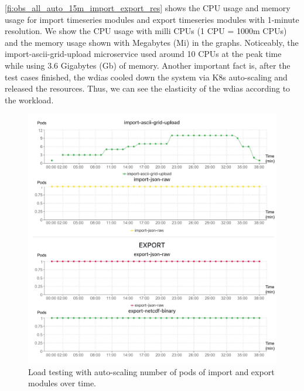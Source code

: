 \cref{fi:obs_all_auto_15m_import_export_res} shows the CPU usage and memory usage for import timeseries modules and export timeseries modules with 1-minute resolution. We show the CPU usage with milli CPUs \cite{LinuxFoundationKubernetes:Containers} (1 CPU = 1000m CPUs) and the memory usage shown with Megabytes (Mi) \cite{LinuxFoundationKubernetes:Containers} in the graphs. Noticeably, the import-ascii-grid-upload microservice used around 10 CPUs at the peak time while using 3.6 Gigabytes (Gb) of memory. Another important fact is, after the test cases finished, the \acrshort{wdias} cooled down the system via K8s auto-scaling and released the resources. Thus, we can see the elasticity of the \acrshort{wdias} according to the workload.

\begin{figure}[htp]
    \centering
    \includegraphics[width=1.0\textwidth]{results/obs/all_auto/obs_all_auto_15m_import_export_pods.pdf}
    \caption{Load testing with auto-scaling number of pods of import and export modules over time.}
    \label{fi:obs_all_auto_15m_import_export_pods}
\end{figure}

